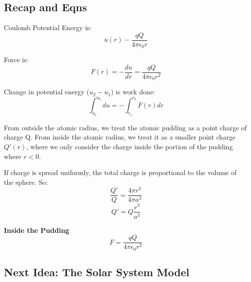 \subsection*{Recap and Eqns}
 
Coulomb Potential Energy is:
\[
    u(r) - \frac{qQ}{4 \pi \epsilon_0 r}
\]

Force is:
\[
    F(r) = -\frac{du}{dr} = \frac{qQ}{4 \pi \epsilon_0 r^2}
\]

Change in potential energy ($u_2 - u_1$) is work done:
\[
    \int_{u_1}^{u_2} du = -\int_{r_1}^{r_2} F(r) dr
\]

From outside the atomic radius, we treat the atomic pudding as a point charge of charge Q.
From inside the atomic radius, we treat it as a smaller point charge $Q'(r)$, where we only consider the charge inside the portion of the pudding where $r<0$.

If charge is spread uniformly, the total charge is proportional to the volume of the sphere. So:
\[
    \frac{Q'}{Q} = \frac{4 \pi r^3}{4 \pi a^3}
\]
\[
    Q' = Q\frac{r^3}{a^3}
\]

\textbf{Inside the Pudding}
\[
    F = \frac{qQ}{4 \pi \epsilon_0 r^2}
\]


\subsection*{Next Idea: The Solar System Model}
